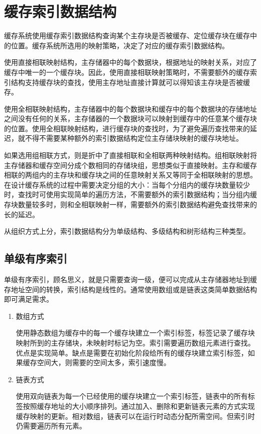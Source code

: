 \section{缓存索引数据结构}
\label{sec:cache_indexing}

缓存系统使用缓存索引数据结构查询某个主存块是否被缓存、定位缓存块在缓存中的位置。缓存系统所选用的映射策略，决定了对应的缓存索引数据结构。

使用直接相联映射结构，主存储器中的每个数据块，根据地址的映射关系，对应了缓存中唯一的一个缓存块。因此，使用直接相联映射策略时，不需要额外的缓存索引结构支持缓存块的查找，使用主存地址直接计算就可以得知该主存块是否被缓存。

使用全相联映射结构，主存储器中的每个数据块和缓存中的每个数据块的存储地址之间没有任何的关系，主存储器的一个数据块可以映射到缓存中的任意某个缓存块的位置。使用全相联映射结构，进行缓存块的查找时，为了避免遍历查找带来的延迟，就不得不需要某种额外的索引数据结构定位主存储块映射的缓存块地址。

如果选用组相联方式，则是折中了直接相联和全相联两种映射结构。组相联映射将主存储器和缓存空间分成个数相同的存储块组，思想类似于直接映射。主存和缓存相联的两组内的主存块和缓存块之间的任意映射关系又等同于全相联映射的思想。在设计缓存系统的过程中需要决定分组的大小：当每个分组内的缓存块数量较少时，查找时可使用实现简单的遍历方法，不需要额外的索引数据结构；当分组内缓存块数量较多时，则和全相联映射一样，需要额外的索引数据结构避免查找带来的长的延迟。

从组织方式上分，索引数据结构分为单级结构、多级结构和树形结构三种类型。

\subsection{单级有序索引}
单级有序索引，顾名思义，就是只需要查询一级，便可以完成从主存储器地址到缓存地址空间的转换，索引结构是线性的。通常使用数组或是链表这类简单数据结构即可满足需求。

\begin{enumerate}
\item 数组方式

使用静态数组为缓存中的每一个缓存块建立一个索引标签，标签记录了缓存块映射所到的主存储块，未映射时标记为空。索引需要遍历数组元素进行查找。优点是实现简单。缺点是需要在初始化阶段给所有的缓存块建立索引标签，如果缓存空间大，则需要的空间太多，索引速度慢。
\item 链表方式

使用双向链表为每一个已经使用的缓存块建立一个索引标签，链表中的所有标签按照缓存地址的大小顺序排列。通过加入、删除和更新链表元素的方式实现缓存映射的更新。相对数组，链表可以在运行时动态分配所需空间。但索引时仍需要遍历所有元素。
\end{enumerate}

